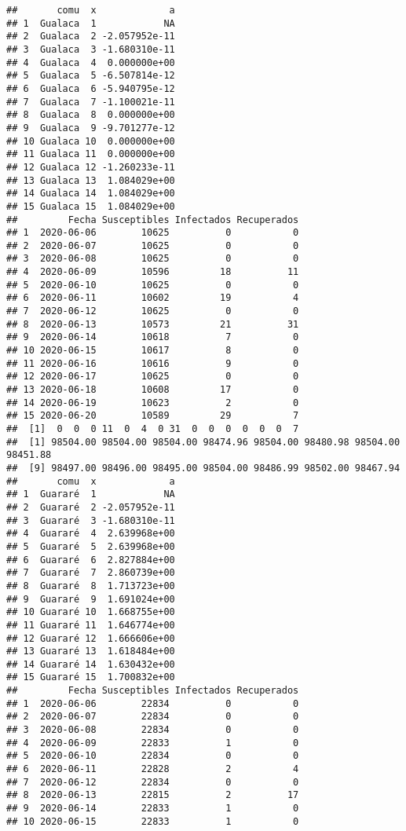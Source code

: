 \documentclass[
]{article}
\begin{document}
\begin{verbatim}
##       comu  x             a
## 1  Gualaca  1            NA
## 2  Gualaca  2 -2.057952e-11
## 3  Gualaca  3 -1.680310e-11
## 4  Gualaca  4  0.000000e+00
## 5  Gualaca  5 -6.507814e-12
## 6  Gualaca  6 -5.940795e-12
## 7  Gualaca  7 -1.100021e-11
## 8  Gualaca  8  0.000000e+00
## 9  Gualaca  9 -9.701277e-12
## 10 Gualaca 10  0.000000e+00
## 11 Gualaca 11  0.000000e+00
## 12 Gualaca 12 -1.260233e-11
## 13 Gualaca 13  1.084029e+00
## 14 Gualaca 14  1.084029e+00
## 15 Gualaca 15  1.084029e+00
##         Fecha Susceptibles Infectados Recuperados
## 1  2020-06-06        10625          0           0
## 2  2020-06-07        10625          0           0
## 3  2020-06-08        10625          0           0
## 4  2020-06-09        10596         18          11
## 5  2020-06-10        10625          0           0
## 6  2020-06-11        10602         19           4
## 7  2020-06-12        10625          0           0
## 8  2020-06-13        10573         21          31
## 9  2020-06-14        10618          7           0
## 10 2020-06-15        10617          8           0
## 11 2020-06-16        10616          9           0
## 12 2020-06-17        10625          0           0
## 13 2020-06-18        10608         17           0
## 14 2020-06-19        10623          2           0
## 15 2020-06-20        10589         29           7
##  [1]  0  0  0 11  0  4  0 31  0  0  0  0  0  0  7
##  [1] 98504.00 98504.00 98504.00 98474.96 98504.00 98480.98 98504.00 98451.88
##  [9] 98497.00 98496.00 98495.00 98504.00 98486.99 98502.00 98467.94
##       comu  x             a
## 1  Guararé  1            NA
## 2  Guararé  2 -2.057952e-11
## 3  Guararé  3 -1.680310e-11
## 4  Guararé  4  2.639968e+00
## 5  Guararé  5  2.639968e+00
## 6  Guararé  6  2.827884e+00
## 7  Guararé  7  2.860739e+00
## 8  Guararé  8  1.713723e+00
## 9  Guararé  9  1.691024e+00
## 10 Guararé 10  1.668755e+00
## 11 Guararé 11  1.646774e+00
## 12 Guararé 12  1.666606e+00
## 13 Guararé 13  1.618484e+00
## 14 Guararé 14  1.630432e+00
## 15 Guararé 15  1.700832e+00
##         Fecha Susceptibles Infectados Recuperados
## 1  2020-06-06        22834          0           0
## 2  2020-06-07        22834          0           0
## 3  2020-06-08        22834          0           0
## 4  2020-06-09        22833          1           0
## 5  2020-06-10        22834          0           0
## 6  2020-06-11        22828          2           4
## 7  2020-06-12        22834          0           0
## 8  2020-06-13        22815          2          17
## 9  2020-06-14        22833          1           0
## 10 2020-06-15        22833          1           0

\end{verbatim}
\end{document}

